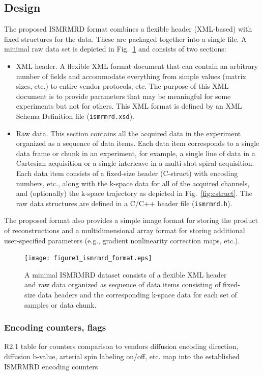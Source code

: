\documentclass[12pt, draft]{article}
\newcommand{\madded}[2][None]{\added[remark=#1]{#2}}
\begin{document}
\subsection*{Design}
The proposed ISMRMRD format combines a flexible header (XML-based) with fixed structures for the data. These are packaged together into a single file.  A minimal raw data set is depicted in Fig.~\ref{fig:format} and consists of two sections:
\begin{itemize}
\item{XML header.} A flexible XML format document that can contain an arbitrary number of fields and accommodate everything from simple values (matrix sizes, etc.) to entire vendor protocols, etc. The purpose of this XML document is to provide parameters that may be meaningful for some experiments but not for others. This XML format is defined by an XML Schema Definition file (\texttt{ismrmrd.xsd}).
\item{Raw data.} This section contains all the acquired data in the experiment organized as a sequence of data items.  Each data item corresponds to a single data frame or chunk in an experiment, for example, a single line of data in a Cartesian acquisition or a single interleave in a multi-shot spiral acquisition. Each data item consists of a fixed-size header (C-struct) with encoding numbers, etc., along with the k-space data for all of the acquired channels, and (optionally) the k-space trajectory as depicted in Fig.~\ref{fig:cstruct}. The raw data structures are defined in a C/C++ header file (\texttt{ismrmrd.h}).
\end{itemize}
The proposed format also provides a simple image format for storing the product of reconstructions and a multidimensional array format for storing additional user-specified parameters (e.g., gradient nonlinearity correction maps, etc.).

\begin{figure}
\begin{center}
\texttt{[image: figure1\_ismrmrd\_format.eps]}
\caption{A minimal ISMRMRD dataset consists of a flexible XML header and raw data organized as sequence of data items consisting of fixed-size data headers and the corresponding k-space data for each set of samples or data chunk.}
\label{fig:format}
\end{center}
\end{figure}

\subsubsection*{Encoding counters, flags}
R2.1 table for counters comparison to vendors
     diffusion encoding direction, diffusion b-value, arterial spin labeling on/off, etc. map into the established ISMRMRD encoding counters
     \madded[]{Fig.~\ref{fig:cstruct}}
\end{document}

